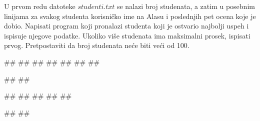 \begin{Exercise}[label=p3_06] 
 U prvom redu datoteke $studenti.txt$ se nalazi broj studenata, a zatim u posebnim linijama za svakog studenta korisničko ime na Alasu i poslednjih pet ocena koje je dobio. Napisati program koji pronalazi studenta koji je ostvario najbolji uspeh i ispisuje njegove podatke. Ukoliko vi\v se studenata ima maksimalni prosek, ispisati prvog. Pretpostaviti da broj studenata neće biti veći od 100.\\
\begin{miditest}
\begin{upotreba}{1}
##
##
##
##
##
##
##

#\naslovIzlaz#
##
\end{upotreba}
\end{miditest}
\begin{miditest}
\begin{upotreba}{2}
##
##
##
##
##

#\naslovIzlaz#
##
\end{upotreba}
\end{miditest}
\end{Exercise}
\begin{Answer}[ref=p3_06]
\end{Answer}

